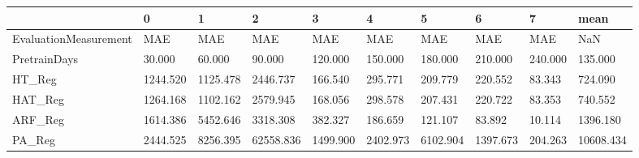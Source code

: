 \begin{tabular}{llllllllll}
\toprule
{} &        0 &        1 &         2 &        3 &        4 &        5 &        6 &       7 &      mean \\
\midrule
EvaluationMeasurement &      MAE &      MAE &       MAE &      MAE &      MAE &      MAE &      MAE &     MAE &       NaN \\
PretrainDays          &   30.000 &   60.000 &    90.000 &  120.000 &  150.000 &  180.000 &  210.000 & 240.000 &   135.000 \\
HT\_Reg                & 1244.520 & 1125.478 &  2446.737 &  166.540 &  295.771 &  209.779 &  220.552 &  83.343 &   724.090 \\
HAT\_Reg               & 1264.168 & 1102.162 &  2579.945 &  168.056 &  298.578 &  207.431 &  220.722 &  83.353 &   740.552 \\
ARF\_Reg               & 1614.386 & 5452.646 &  3318.308 &  382.327 &  186.659 &  121.107 &   83.892 &  10.114 &  1396.180 \\
PA\_Reg                & 2444.525 & 8256.395 & 62558.836 & 1499.900 & 2402.973 & 6102.904 & 1397.673 & 204.263 & 10608.434 \\
\bottomrule
\end{tabular}
